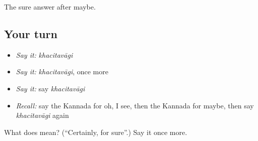 \begin{grammarlens}[title={What you've built}]
The sure answer after maybe.
\end{grammarlens}

\subsection*{Your turn}
\begin{itemize}
\raggedright
  \item \emph{Say it:} \emph{khacitavāgi}
  \item \emph{Say it:} \emph{khacitavāgi}, once more
  \item \emph{Say it:} say \emph{khacitavāgi}
  \item \emph{Recall:} say the Kannada for oh, I see, then the Kannada for maybe, then say \emph{khacitavāgi} again
\end{itemize}

\begin{tcolorbox}[breakable,colback=teal!4,colframe=teal!35!black,title={Before you move on}]
What does  mean? (\textquotedblleft{}Certainly, for sure\textquotedblright{}.) Say it once more.
\end{tcolorbox}
